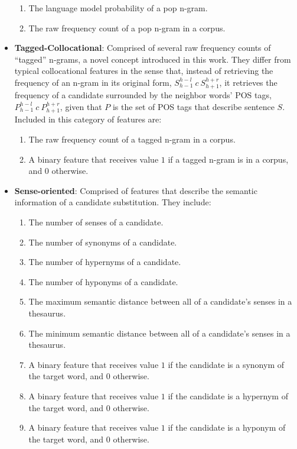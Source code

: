 \begin{itemize}
\begin{enumerate}
	\item The language model probability of a pop n-gram.
	\item The raw frequency count of a pop n-gram in a corpus.
\end{enumerate}

\item \textbf{Tagged-Collocational}: Comprised of several raw frequency counts of ``tagged'' n-grams, a novel concept introduced in this work. They differ from typical collocational features in the sense that, instead of retrieving the frequency of an n-gram in its original form, $S_{h-1}^{h-l} \: c \: S_{h+1}^{h+r}$, it retrieves the frequency of a candidate surrounded by the neighbor words' POS tags, $P_{h-1}^{h-l} \: c \: P_{h+1}^{h+r}$, given that $P$ is the set of POS tags that describe sentence $S$. Included in this category of features are:

\begin{enumerate}
	\item The raw frequency count of a tagged n-gram in a corpus.
	\item A binary feature that receives value $1$ if a tagged n-gram is in a corpus, and $0$ otherwise.
\end{enumerate}

\item \textbf{Sense-oriented}: Comprised of features that describe the semantic information of a candidate substitution. They include:

\begin{enumerate}
	\item The number of senses of a candidate.
	\item The number of synonyms of a candidate.
	\item The number of hypernyms of a candidate.
	\item The number of hyponyms of a candidate.
	\item The maximum semantic distance between all of a candidate's senses in a thesaurus.
	\item The minimum semantic distance between all of a candidate's senses in a thesaurus.
	\item A binary feature that receives value $1$ if the candidate is a synonym of the target word, and $0$ otherwise.
	\item A binary feature that receives value $1$ if the candidate is a hypernym of the target word, and $0$ otherwise.
	\item A binary feature that receives value $1$ if the candidate is a hyponym of the target word, and $0$ otherwise.
\end{enumerate}


\end{itemize}
